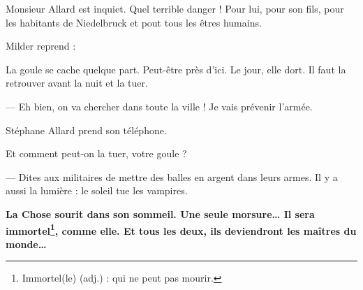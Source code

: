 Monsieur Allard est inquiet. Quel terrible danger ! Pour lui, pour son fils, pour les habitants de Niedelbruck et pout tous les
êtres humains. \fg{}

Milder reprend :

\og La goule se cache quelque part. Peut-être près d'ici. Le jour, elle dort. Il faut la retrouver avant la nuit et la tuer.

--- Eh bien, on va chercher dans toute la ville ! Je vais prévenir l'armée. \fg{}

Stéphane Allard prend son téléphone.

\og Et comment peut-on la tuer, votre goule ?

--- Dites aux militaires de mettre des balles en argent dans leurs armes. Il y a aussi la lumière : le soleil tue les vampires.
\fg{}

\textbf{La Chose sourit dans son sommeil. Une seule morsure\ldots{} Il sera immortel\footnote{Immortel(le) (adj.) : qui ne peut pas
mourir.}, comme elle. Et tous les deux, ils deviendront les maîtres du monde\ldots{}}
